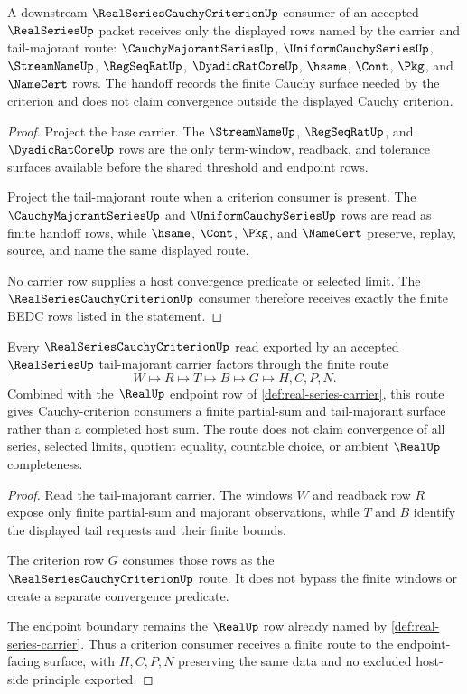 \begin{theorem}
\label{thm:realseries-cauchy-criterion-handoff}
A downstream $\RealSeriesCauchyCriterionUp$ consumer of an accepted $\RealSeriesUp$ packet receives only the displayed rows named by the carrier and tail-majorant route: $\CauchyMajorantSeriesUp$, $\UniformCauchySeriesUp$, $\StreamNameUp$, $\RegSeqRatUp$, $\DyadicRatCoreUp$, $\hsame$, $\Cont$, $\Pkg$, and $\NameCert$ rows. The handoff records the finite Cauchy surface needed by the criterion and does not claim convergence outside the displayed Cauchy criterion.
\end{theorem}
\begin{proof}
Project the base carrier. The $\StreamNameUp$, $\RegSeqRatUp$, and $\DyadicRatCoreUp$ rows are the only term-window, readback, and tolerance surfaces available before the shared threshold and endpoint rows.

Project the tail-majorant route when a criterion consumer is present. The $\CauchyMajorantSeriesUp$ and $\UniformCauchySeriesUp$ rows are read as finite handoff rows, while $\hsame$, $\Cont$, $\Pkg$, and $\NameCert$ preserve, replay, source, and name the same displayed route.

No carrier row supplies a host convergence predicate or selected limit. The $\RealSeriesCauchyCriterionUp$ consumer therefore receives exactly the finite BEDC rows listed in the statement.
\end{proof}

\begin{theorem}
\label{thm:realseries-cauchy-criterion-route}
Every $\RealSeriesCauchyCriterionUp$ read exported by an accepted $\RealSeriesUp$ tail-majorant carrier factors through the finite route
$$
W\longmapsto R\longmapsto T\longmapsto B\longmapsto G\longmapsto H,C,P,N .
$$
Combined with the $\RealUp$ endpoint row of \autoref{def:real-series-carrier}, this route gives Cauchy-criterion consumers a finite partial-sum and tail-majorant surface rather than a completed host sum. The route does not claim convergence of all series, selected limits, quotient equality, countable choice, or ambient $\RealUp$ completeness.
\end{theorem}
\begin{proof}
Read the tail-majorant carrier. The windows $W$ and readback row $R$ expose only finite partial-sum and majorant observations, while $T$ and $B$ identify the displayed tail requests and their finite bounds.

The criterion row $G$ consumes those rows as the $\RealSeriesCauchyCriterionUp$ route. It does not bypass the finite windows or create a separate convergence predicate.

The endpoint boundary remains the $\RealUp$ row already named by \autoref{def:real-series-carrier}. Thus a criterion consumer receives a finite route to the endpoint-facing surface, with $H,C,P,N$ preserving the same data and no excluded host-side principle exported.
\end{proof}

